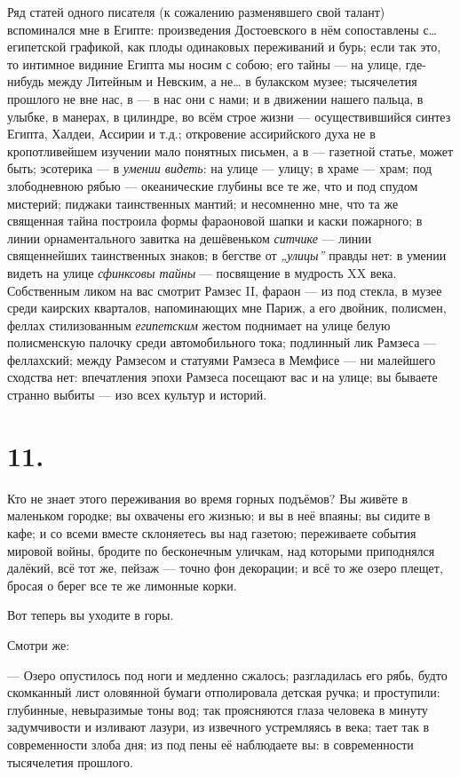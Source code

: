 \documentclass[12pt,a4paper,oneside]{book}
\begin{document}
Ряд статей одного писателя (к сожалению разменявшего свой талант) вспоминался мне в Египте: произведения Достоевского в нём сопоставлены с… египетской графикой, как плоды одинаковых переживаний и бурь; если так это, то интимное видиние Египта мы носим с собою; его тайны — на улице, где-нибудь между Литейным и Невским, а не… в булакском музее; тысячелетия прошлого не вне нас, в — в нас они с нами; и в движении нашего пальца, в улыбке, в манерах, в цилиндре, во всём строе жизни — осуществившийся синтез Египта, Халдеи, Ассирии и т.д.; откровение ассирийского духа не в кропотливейшем изучении мало понятных письмен, а в — газетной статье, может быть; эсотерика — в \emph{умении видеть}: на улице — улицу; в храме — храм; под злободневною рябью — океанические глубины все те же, что и под спудом мистерий; пиджаки таинственных мантий; и несомненно мне, что та же священная тайна построила формы фараоновой шапки и каски пожарного; в линии орнаментального завитка на дешёвеньком \emph{ситчике} — линии священнейших таинственных знаков; в бегстве от \emph{„улицы”} правды нет: в умении видеть на улице \emph{сфинксовы тайны} — посвящение в мудрость XX века. Собственным ликом на вас смотрит Рамзес II, фараон — из под стекла, в музее среди каирских кварталов, напоминающих мне Париж, а его двойник, полисмен, феллах стилизованным \emph{египетским} жестом поднимает на улице белую полисменскую палочку среди автомобильного тока; подлинный лик Рамзеса — феллахский; между Рамзесом и статуями Рамзеса в Мемфисе — ни малейшего сходства нет: впечатления эпохи Рамзеса посещают вас и на улице; вы бываете странно выбиты — изо всех культур и историй.

\section*{11.}

Кто не знает этого переживания во время горных подъёмов? Вы живёте в маленьком городке; вы охвачены его жизнью; и вы в неё впаяны; вы сидите в кафе; и со всеми вместе склоняетесь вы над газетою; переживаете события мировой войны, бродите по бесконечным уличкам, над которыми приподнялся далёкий, всё тот же, пейзаж — точно фон декорации; и всё то же озеро плещет, бросая о берег все те же лимонные корки.

Вот теперь вы уходите в горы.

Смотри же:

— Озеро опустилось под ноги и медленно сжалось; разгладилась его рябь, будто скомканный лист оловянной бумаги отполировала детская ручка; и проступили: глубинные, невыразимые тоны вод; так проясняются глаза человека в минуту задумчивости и изливают лазури, из извечного устремляясь в века; тает так в современности злоба дня; из под пены её наблюдаете вы: в современности тысячелетия прошлого.
\end{document}
